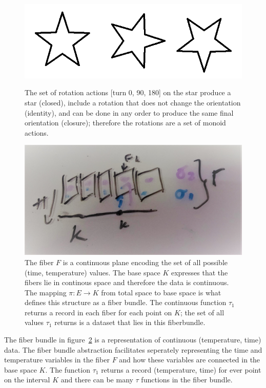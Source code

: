 \begin{figure}[ht!]
    \includegraphics[width=\textwidth]{figures/math/rotation_actions.png}
    \label{fig:data_monoid_rotation}
    \caption{The set of rotation actions [turn 0, 90, 180] on the star produce a star (closed), include a rotation that does not change the orientation (identity), and can be done in any order to produce the same final orientation (closure); therefore the rotations are a set of monoid actions.
    }  
\end{figure}

\begin{figure}[ht!]
    \includegraphics[width=.5\linewidth]{figures/math/fiberbundle.png}
  
    \caption{ The fiber $F$ is a continuous plane encoding the set of all possible (time, temperature) values.  The base space $K$ expresses that the fibers lie in continous space and therefore the data is continuous. The mapping $\pi:E\rightarrow K$ from total space to base space is what defines this structure as a fiber bundle. The continuous function $\tau_1$ returns a record in each fiber for each point on $K$; the set of all values $\tau_1$ returns is a dataset that lies in this fiberbundle. }
    \label{fig:data_base_space} 
\end{figure}
The fiber bundle in figure~\ref{fig:data_base_space} is a representation of continuous (temperature, time) data. The fiber bundle abstraction facilitates seperately representing the time and temperature variables in the fiber $F$ and how these variables are connected in the base space $K$.  The function $\tau_1$ returns a record (temperature, time) for ever point on the interval $K$ and there can be many $\tau$ functions in the fiber bundle. 
